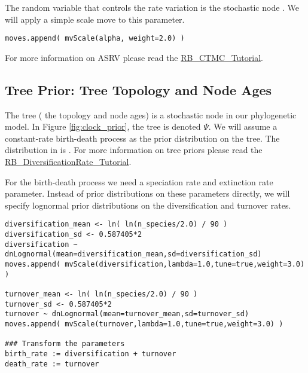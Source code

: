 The random variable that controls the rate variation is the stochastic node . 
We will apply a simple scale move to this parameter.
{\tt \begin{snugshade*}
\begin{lstlisting}
moves.append( mvScale(alpha, weight=2.0) )
\end{lstlisting}
\end{snugshade*}}

For more information on ASRV please read the \href{https://github.com/revbayes/revbayes_tutorial/raw/master/tutorial_TeX/RB_CTMC_Tutorial/RB_CTMC_Tutorial.pdf}{RB\_CTMC\_Tutorial}.



\subsection{Tree Prior: Tree Topology and Node Ages}

The tree ( the topology and node ages) is a stochastic node in our phylogenetic model. 
In Figure \ref{fig:clock_prior}, the tree is denoted $\Psi$.
We will assume a constant-rate birth-death process as the prior distribution on the tree.
The distribution in \RevBayes is . 
For more information on tree priors please read the \href{https://github.com/revbayes/revbayes_tutorial/raw/master/tutorial_TeX/RB_DiversificationRate_Tutorial/RB_Diversification_Tutorial.pdf}{RB\_DiversificationRate\_Tutorial}.

For the birth-death process we need a speciation rate and extinction rate parameter.
Instead of prior distributions on these parameters directly, we will specify lognormal prior distributions on the diversification and turnover rates.
{\tt \begin{snugshade*}
\begin{lstlisting}
diversification_mean <- ln( ln(n_species/2.0) / 90 )
diversification_sd <- 0.587405*2
diversification ~ dnLognormal(mean=diversification_mean,sd=diversification_sd) 
moves.append( mvScale(diversification,lambda=1.0,tune=true,weight=3.0) )

turnover_mean <- ln( ln(n_species/2.0) / 90 )
turnover_sd <- 0.587405*2
turnover ~ dnLognormal(mean=turnover_mean,sd=turnover_sd) 
moves.append( mvScale(turnover,lambda=1.0,tune=true,weight=3.0) )

### Transform the parameters
birth_rate := diversification + turnover
death_rate := turnover
\end{lstlisting}
\end{snugshade*}}


